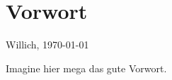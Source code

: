 \section*{Vorwort}

\begin{flushright} 
Willich, \today
\end{flushright}

Imagine hier mega das gute Vorwort.